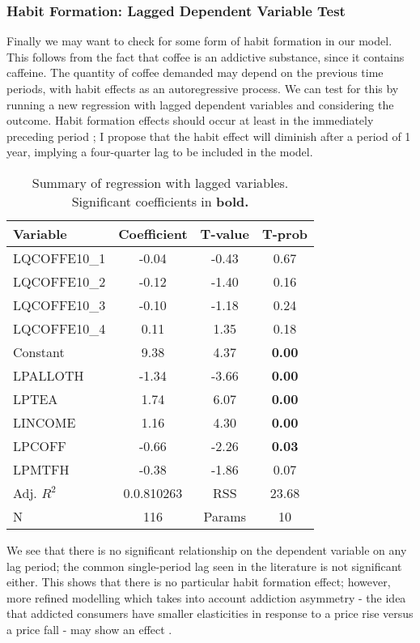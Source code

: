 \documentclass[12pt]{article}
\begin{document}
\subsubsection{Habit Formation:  Lagged Dependent Variable Test} %
\label{ssub:habit_formation}
Finally we may want to check for some form of habit formation in our model. This follows from the fact that coffee is an addictive substance, since it contains caffeine. The quantity of coffee demanded may depend on the previous time periods, with habit effects as an autoregressive process. We can test for this by running a new regression with lagged dependent variables and considering the outcome. Habit formation effects should occur at least in the immediately preceding period \parencite{pollakHabitFormationDynamic1970}; I propose that the habit effect will diminish after a period of 1 year, implying a four-quarter lag to be included in the model.
\begin{table}[!htb]\caption{\label{tb:lagvar} Summary of regression with lagged variables. Significant coefficients in \textbf{bold.}}\centering
\begin{tabular}{lccc}
Variable     & Coefficient & T-value & T-prob \\\hline\hline
LQCOFFE10\_1 & -0.04       & -0.43   & 0.67   \\
LQCOFFE10\_2 & -0.12       & -1.40   & 0.16   \\
LQCOFFE10\_3 & -0.10       & -1.18   & 0.24   \\
LQCOFFE10\_4 & 0.11        & 1.35    & 0.18   \\
Constant     & 9.38        & 4.37    & \textbf{0.00  } \\
LPALLOTH     & -1.34       & -3.66   & \textbf{0.00 }  \\
LPTEA        & 1.74        & 6.07    & \textbf{0.00}   \\
LINCOME      & 1.16        & 4.30    & \textbf{0.00}   \\
LPCOFF       & -0.66       & -2.26   & \textbf{0.03}   \\
LPMTFH       & -0.38       & -1.86   & 0.07  \\\hline
Adj. \(R^2\)	     & 0.0.810263	   & RSS	& 23.68 \\
N			 & 116		& Params	& 10	
\end{tabular}
\end{table}
We see that there is no significant relationship on the dependent variable on any lag period; the common single-period lag seen in the literature is not significant either. This shows that there is no particular habit formation effect; however, more refined modelling which takes into account addiction asymmetry - the idea that addicted consumers have smaller elasticities in response to a price rise versus a price fall - may show an effect \parencite{youngADDICTIONASYMMETRYDEMAND1982a}. 
\end{document}
